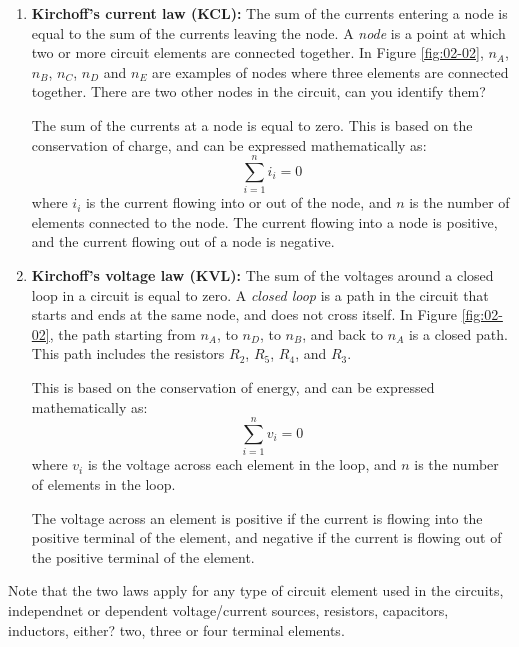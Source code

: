 \begin{enumerate}
    \item \textbf{Kirchoff's current law (KCL):} The sum of the currents entering a node is equal to the sum of the currents leaving the node. A \textit{node} is a point at which two or more circuit elements are connected together. In Figure \ref{fig:02-02}, $n_A$, $n_B$, $n_C$, $n_D$ and $n_E$ are examples of nodes where three elements are connected together. There are two other nodes in the circuit, can you identify them? 
    
    The sum of the currents at a node is equal to zero. This is based on the conservation of charge, and can be expressed mathematically as:
    \begin{equation}
        \sum_{i=1}^{n} i_i = 0
        \label{eq:02-11}
    \end{equation}
    where $i_i$ is the current flowing into or out of the node, and $n$ is the number of elements connected to the node. The current flowing into a node is positive, and the current flowing out of a node is negative.
    
    \item \textbf{Kirchoff's voltage law (KVL):} The sum of the voltages around a closed loop in a circuit is equal to zero. A \textit{closed loop} is a path in the circuit that starts and ends at the same node, and does not cross itself. In Figure \ref{fig:02-02}, the path starting from $n_A$, to $n_D$, to $n_B$, and back to $n_A$ is a closed path. This path includes the resistors $R_2$, $R_5$, $R_4$, and $R_3$. 
    
    This is based on the conservation of energy, and can be expressed mathematically as:
    \begin{equation}
        \sum_{i=1}^{n} v_i = 0
        \label{eq:02-12}
    \end{equation}
    where $v_i$ is the voltage across each element in the loop, and $n$ is the number of elements in the loop.

    The voltage across an element is positive if the current is flowing into the positive terminal of the element, and negative if the current is flowing out of the positive terminal of the element.
\end{enumerate}

Note that the two laws apply for any type of circuit element used in the circuits, independnet or dependent voltage/current sources, resistors, capacitors, inductors, either? two, three or four terminal elements.

